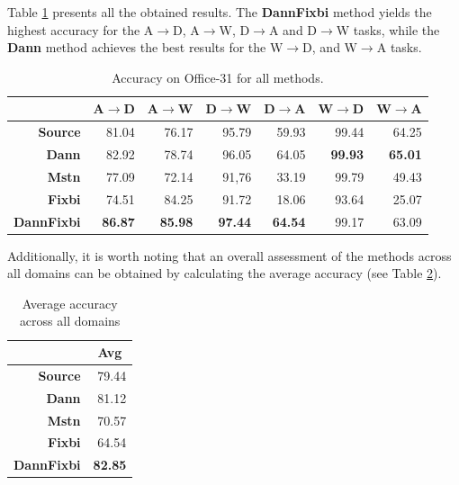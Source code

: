 Table \ref{tab:all} presents all the obtained results. The \textbf{DannFixbi} method yields the highest accuracy for the A$\rightarrow$D, A$\rightarrow$W, D$\rightarrow$A and D$\rightarrow$W tasks, while the \textbf{Dann} method achieves the best results for the W$\rightarrow$D, and W$\rightarrow$A tasks.

\begin{table}[H]
\centering
\caption{Accuracy on Office-31 for all methods.}
\label{tab:all}
\begin{tabular}{|r|r|r|r|r|r|r|}
\hline
\multicolumn{1}{|l|}{} & \multicolumn{1}{l|}{A$\rightarrow$D} & \multicolumn{1}{l|}{A$\rightarrow$W} & \multicolumn{1}{l|}{D$\rightarrow$W} & \multicolumn{1}{l|}{D$\rightarrow$A} & \multicolumn{1}{l|}{W$\rightarrow$D} & \multicolumn{1}{l|}{W$\rightarrow$A} \\ \hline
\textbf{Source} & 81.04 & 76.17 & 95.79 & 59.93 & 99.44 & 64.25 \\ \hline
\textbf{Dann} & 82.92 & 78.74 & 96.05 & 64.05 & \textbf{99.93} & \textbf{65.01} \\ \hline
\textbf{Mstn} & 77.09 & 72.14 & 91,76 & 33.19 & 99.79 & 49.43 \\ \hline
\textbf{Fixbi} & 74.51 & 84.25 & 91.72 & 18.06 & 93.64 & 25.07 \\ \hline
\textbf{DannFixbi} & \textbf{86.87} & \textbf{85.98} & \textbf{97.44} & \textbf{64.54} & 99.17 & 63.09 \\ \hline
\end{tabular}
\end{table}

Additionally, it is worth noting that an overall assessment of the  methods across all domains can be obtained by calculating the average accuracy (see Table \ref{tab:avg}).

\begin{table}[H]
\centering
\caption{Average accuracy across all domains}
\label{tab:avg}
\begin{tabular}{|r|r|}
\hline
                          & \multicolumn{1}{c|}{Avg} \\ \hline
\textbf{Source}           & 79.44                    \\ \hline
\textbf{Dann}             & 81.12                    \\ \hline
\textbf{Mstn} & 70.57                    \\ \hline
\textbf{Fixbi}            & 64.54                    \\ \hline
\textbf{DannFixbi}        & \textbf{82.85}           \\ \hline
\end{tabular}
\end{table}


